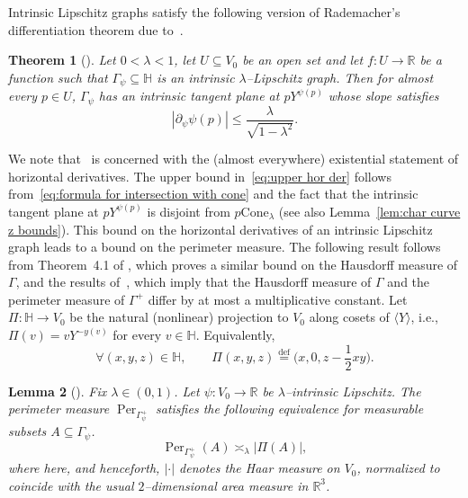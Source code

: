 \documentclass[11pt,reqno]{amsart}
\renewcommand{\H}{\mathbb{H}}
\newcommand{\R}{\mathbb{R}}
\newcommand{\0}{\mathbf{0}}
\renewcommand{\1}{\mathbf 1}
\newcommand{\from}{\colon}
\renewcommand{\subset}{\subseteq}
\newcommand{\eqdef}{\stackrel{\mathrm{def}}{=}}
\renewcommand{\le}{\leqslant}
\newtheorem{thm}{Theorem}[section]
\newtheorem{lemma}[thm]{Lemma}
\theoremstyle{remark}
\DeclareMathOperator{\Per}{Per}
\begin{document}
Intrinsic Lipschitz graphs satisfy the following  version of Rademacher's differentiation theorem due to~\cite[Theorem~4.29]{FSSCDifferentiability}.
\begin{thm}[\cite{FSSCDifferentiability}]
  Let $0 < \lambda < 1$, let $U\subset V_0$ be an open set and let $f\from U\to \R$ be a function such that $\Gamma_\psi \subset \H$ is an intrinsic $\lambda$--Lipschitz graph.  Then for almost every $p\in U$, $\Gamma_\psi$ has an intrinsic tangent plane at $pY^{\psi(p)}$ whose slope satisfies
  \begin{equation}\label{eq:upper hor der}
  |\partial_\psi \psi(p)|\le \frac{\lambda}{\sqrt{1-\lambda^2}}.
\end{equation}
\end{thm}
We note that~\cite[Theorem~4.29]{FSSCDifferentiability} is concerned with the (almost everywhere) existential statement of horizontal derivatives. The upper bound in~\eqref{eq:upper hor der} follows from~\eqref{eq:formula for intersection with cone} and the fact that the intrinsic tangent plane at $pY^{\psi(p)}$ is disjoint from $p\mathrm{Cone}_\lambda$
(see also Lemma~\ref{lem:char curve z bounds}). This bound on the horizontal derivatives of an intrinsic Lipschitz graph leads to a bound on the perimeter measure.
The following result follows from Theorem~4.1 of \cite{FSSC-AreaFormula}, which proves a similar bound on the Hausdorff measure of
$\Gamma$, and the results of~\cite{FSSCRectifiability}, which imply that the Hausdorff measure of $\Gamma$ and the perimeter measure of $\Gamma^+$ differ by at most a multiplicative constant.  Let $\Pi\from \H \to V_0$ be the natural (nonlinear) projection to $V_0$ along cosets of $\langle Y\rangle$, i.e., $\Pi(v)=vY^{-y(v)}$ for every $v\in \H$. Equivalently,
\begin{equation}\label{eq:Pi formula}
\forall(x,y,z)\in \H,\qquad   \Pi(x,y,z)\eqdef \big(x,0,z-\frac{1}{2}xy\big).
\end{equation}
\begin{lemma}[{\cite{FSSC-AreaFormula}}]\label{lem:intrinsic Lipschitz perimeter}
  Fix $\lambda\in (0,1)$. Let $\psi\from V_0\to \R$ be $\lambda$--intrinsic Lipschitz.  The perimeter measure $\Per_{\Gamma_\psi^+}$ satisfies the following equivalence for measurable subsets $A\subset \Gamma_\psi$.
  $$\Per_{\Gamma_\psi^+}(A) \asymp_\lambda |\Pi(A)|,$$
  where here, and henceforth, $|\cdot|$ denotes the Haar measure on $V_0$, normalized to coincide with the usual $2$--dimensional area measure in $\R^3$.
\end{lemma}
\end{document}
